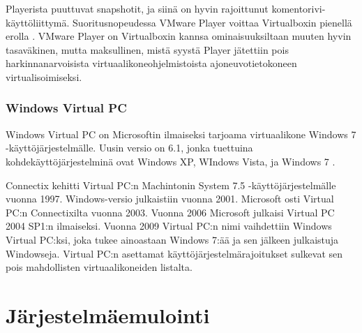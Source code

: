 Playerista puuttuvat snapshotit, ja siinä on hyvin rajoittunut komentorivi-käyttöliittymä. Suoritusnopeudessa VMware Player voittaa Virtualboxin pienellä erolla \cite{vplayervsvbox}. VMware Player on Virtualboxin kannsa ominaisuuksiltaan muuten hyvin tasaväkinen, mutta maksullinen, mistä syystä Player jätettiin pois harkinnanarvoisista virtuaalikoneohjelmistoista ajoneuvotietokoneen virtualisoimiseksi.






\subsubsection{Windows Virtual PC}
Windows Virtual PC on Microsoftin ilmaiseksi tarjoama virtuaalikone Windows 7 -käyttöjärjestelmälle. Uusin versio on 6.1, jonka tuettuina kohdekäyttöjärjestelminä ovat Windows XP, WIndows Vista, ja Windows 7 \cite{vpc_tips}.

Connectix kehitti Virtual PC:n Machintonin System 7.5 -käyttöjärjestelmälle vuonna 1997. Windows-versio julkaistiin vuonna 2001. Microsoft osti Virtual PC:n Connectixilta vuonna 2003. Vuonna 2006 Microsoft julkaisi Virtual PC 2004 SP1:n ilmaiseksi. Vuonna 2009 Virtual PC:n nimi vaihdettiin Windows Virtual PC:ksi, joka tukee ainoastaan Windows 7:ää ja sen jälkeen julkaistuja Windowseja. Virtual PC:n asettamat käyttöjärjestelmärajoitukset sulkevat sen pois mahdollisten virtuaalikoneiden listalta.


\section{Järjestelmäemulointi}


